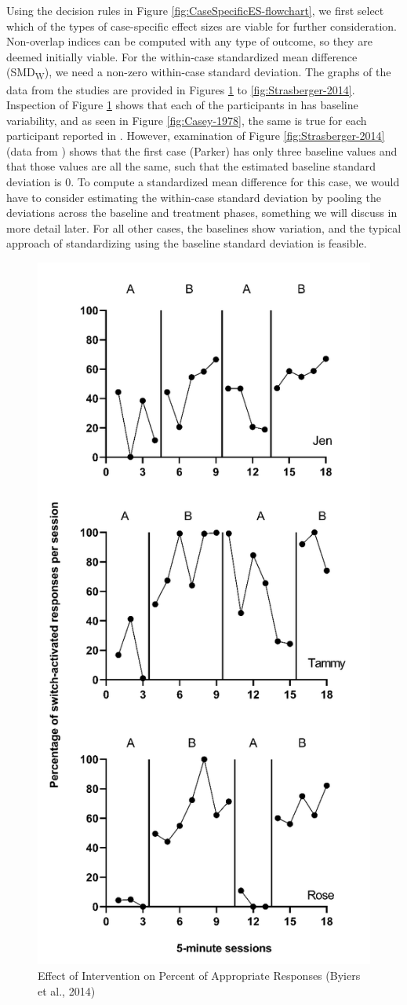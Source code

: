 \documentclass[
]{book}
\begin{document}
Using the decision rules in Figure \ref{fig:CaseSpecificES-flowchart}, we first select which of the types of case-specific effect sizes are viable for further consideration. Non-overlap indices can be computed with any type of outcome, so they are deemed initially viable. For the within-case standardized mean difference (SMD\textsubscript{W}), we need a non-zero within-case standard deviation. The graphs of the data from the studies are provided in Figures \ref{fig:Byiers-2014} to \ref{fig:Strasberger-2014}. Inspection of Figure \ref{fig:Byiers-2014} shows that each of the participants in \citet{Byiers2014} has baseline variability, and as seen in Figure \ref{fig:Casey-1978}, the same is true for each participant reported in \citet{Casey1978}. However, examination of Figure \ref{fig:Strasberger-2014} (data from \citet{StrasbergerFerreri2014}) shows that the first case (Parker) has only three baseline values and that those values are all the same, such that the estimated baseline standard deviation is 0. To compute a standardized mean difference for this case, we would have to consider estimating the within-case standard deviation by pooling the deviations across the baseline and treatment phases, something we will discuss in more detail later. For all other cases, the baselines show variation, and the typical approach of standardizing using the baseline standard deviation is feasible.

\begin{figure}
\includegraphics[width=0.6\linewidth]{images/Byiers2014} \caption{Effect of Intervention on Percent of Appropriate Responses (Byiers et al., 2014)}\label{fig:Byiers-2014}
\end{figure}
\end{document}
